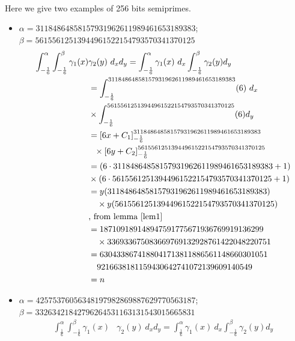 \documentclass[sigconf,balance=false]{acmart}
\begin{document}
\begin{example} \ \\ \rm{
Here we give two examples of 256 bits semiprimes. 
\begin{itemize}
\item
$\alpha=31184864858157931962611989461653189383$;\\ $\beta=56155612513944961522154793570341370125$
\begin{align*}
\displaystyle\int_{-\frac{1}{6}}^{\alpha} \int_{- \frac{1}{6}}^{\beta}\gamma_{1}(x)&\gamma_{2}(y) \ d_{x}d_{y}=\displaystyle\int_{- \frac{1}{6}}^{\alpha} \gamma_{1}(x)\ d_{x}\int_{- \frac{1}{6}}^{\beta}\gamma_{2}(y)d_{y}\\
&=\displaystyle\int_{- \frac{1}{6}}^{31184864858157931962611989461653189383} (6)\ d_{x}\\
&\times\int_{- \frac{1}{6}}^{56155612513944961522154793570341370125}(6)d_{y}\\
&=\displaystyle\left[6x+ C_{1} \right]_{- \frac{1}{6}}^{31184864858157931962611989461653189383}\\  
& \ \ \times\displaystyle\left[6y+ C_{2} \right]_{- \frac{1}{6}}^{56155612513944961522154793570341370125}\\
&=\displaystyle\left(6\cdot 31184864858157931962611989461653189383+ 1 \right)\\ 
&\times \left(6\cdot 56155612513944961522154793570341370125+ 1 \right) \\
&=y(31184864858157931962611989461653189383)\\
& \ \ \ \times  y(56155612513944961522154793570341370125)\\
& \text{, from lemma \ref{lem1}}\\
&=187109189148947591775671936769919136299\\
&\ \ \ \times 336933675083669769132928761422048220751\\
&=6304338674188041713811886561148660301051\\
& \ \ \ 9216638181159430642741072139609140549\\
&=n
\end{align*}
\item
$\alpha=42575376056348197982869887629770563187$;\\ $\beta=33263421842796264531163131543015665831$
\begin{align*}
\displaystyle\int_{\frac{1}{6}}^{\alpha} \int_{- \frac{1}{6}}^{\beta}\gamma_{1}(x)&\gamma_{2}(y) \ d_{x}d_{y}=\displaystyle\int_{\frac{1}{6}}^{\alpha} \gamma_{1}(x)\ d_{x}\int_{-\frac{1}{6}}^{\beta}\gamma_{2}(y)d_{y}\\

\end{align*}
\end{itemize}}
\end{example}
\end{document}
